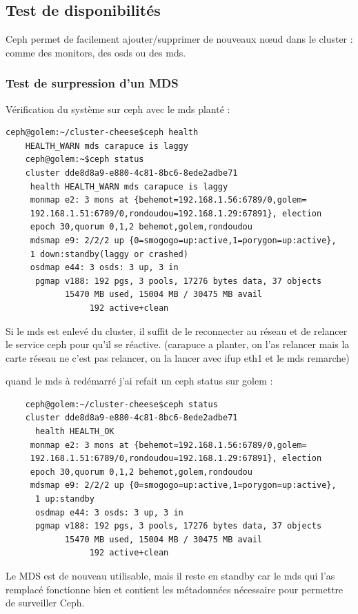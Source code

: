\documentclass[12pt]{article}
\begin{document}
	\subsection{Test de disponibilités}
	Ceph permet de facilement ajouter/supprimer de nouveaux nœud dans le cluster : comme des monitors, des osds ou des mds.

	\subsubsection{Test de surpression d'un MDS}
	Vérification du système sur ceph avec le mds planté :
\begin{verbatim}
ceph@golem:~/cluster-cheese$ceph health 
    HEALTH_WARN mds carapuce is laggy  
    ceph@golem:~$ceph status     
    cluster dde8d8a9-e880-4c81-8bc6-8ede2adbe71
     health HEALTH_WARN mds carapuce is laggy 
     monmap e2: 3 mons at {behemot=192.168.1.56:6789/0,golem=
     192.168.1.51:6789/0,rondoudou=192.168.1.29:67891}, election 
     epoch 30,quorum 0,1,2 behemot,golem,rondoudou 
     mdsmap e9: 2/2/2 up {0=smogogo=up:active,1=porygon=up:active}, 
     1 down:standby(laggy or crashed)
     osdmap e44: 3 osds: 3 up, 3 in 
      pgmap v188: 192 pgs, 3 pools, 17276 bytes data, 37 objects 
            15470 MB used, 15004 MB / 30475 MB avail 
                 192 active+clean 
\end{verbatim}
	Si le mds est enlevé du cluster, il suffit de le reconnecter au réseau et de relancer le service ceph pour qu'il se réactive.
(carapuce  a planter,  on l'as relancer mais la carte réseau ne c'est pas relancer, on la lancer avec ifup eth1 et le mds remarche)

quand le mds à redémarré j'ai refait un ceph status sur golem :
\begin{verbatim}
    ceph@golem:~/cluster-cheese$ceph status     
    cluster dde8d8a9-e880-4c81-8bc6-8ede2adbe71
      health HEALTH_OK  
     monmap e2: 3 mons at {behemot=192.168.1.56:6789/0,golem=
     192.168.1.51:6789/0,rondoudou=192.168.1.29:67891}, election 
     epoch 30,quorum 0,1,2 behemot,golem,rondoudou 
     mdsmap e9: 2/2/2 up {0=smogogo=up:active,1=porygon=up:active},
      1 up:standby
      osdmap e44: 3 osds: 3 up, 3 in 
      pgmap v188: 192 pgs, 3 pools, 17276 bytes data, 37 objects 
            15470 MB used, 15004 MB / 30475 MB avail 
                 192 active+clean 
\end{verbatim}

Le MDS est de nouveau utilisable, mais il reste en standby car le mds qui l'as remplacé fonctionne bien et contient les métadonnées nécessaire pour permettre de surveiller Ceph.
\end{document}
